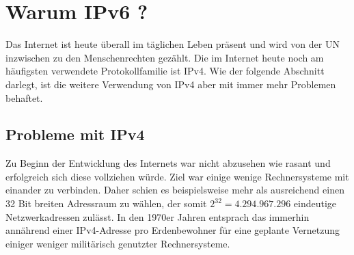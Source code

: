 \documentclass[a4paper,12pt]{scrartcl}
\begin{document}
\clearpage
\section{Warum IPv6 ?}
Das Internet ist heute überall im täglichen Leben präsent und wird von der UN inzwischen zu den Menschenrechten gezählt.\cite{uninet} Die im Internet heute noch am häufigsten verwendete Protokollfamilie ist IPv4. Wie der folgende Abschnitt darlegt, ist die weitere Verwendung von IPv4 aber mit immer mehr Problemen behaftet.

\subsection{Probleme mit IPv4}
Zu Beginn der Entwicklung des Internets war nicht abzusehen wie rasant und erfolgreich sich diese vollziehen würde. Ziel war einige wenige Rechnersysteme mit einander zu verbinden. Daher schien es beispielsweise mehr als ausreichend einen 32 Bit breiten Adressraum zu wählen, der somit $2^{32} = 4.294.967.296$ eindeutige Netzwerkadressen zulässt. In den 1970er Jahren entsprach das immerhin annährend einer IPv4-Adresse pro Erdenbewohner f\"ur eine geplante Vernetzung einiger weniger milit\"arisch genutzter Rechnersysteme.
\end{document}
